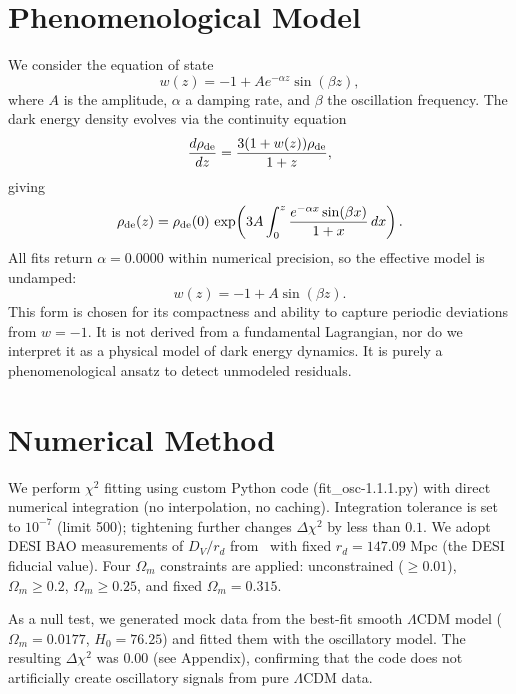 \documentclass[10pt,a4paper,twocolumn]{article}
\begin{document}
\section{Phenomenological Model}
We consider the equation of state
\[
w(z) = -1 + A e^{-\alpha z}\sin(\beta z),
\]
where $A$ is the amplitude, $\alpha$ a damping rate, and $\beta$ the oscillation frequency. The dark energy density evolves via the continuity equation
\[
\frac{d\rho_{\rm de}}{dz} = \frac{3(1+w(z))\rho_{\rm de}}{1+z},
\]
giving
\[
\rho_{\rm de}(z) = \rho_{\rm de}(0)\,\exp\!\left(3A\int_0^z \frac{e^{-\alpha x}\sin(\beta x)}{1+x}\,dx\right).
\]
All fits return $\alpha=0.0000$ within numerical precision, so the effective model is undamped:
\[
w(z) = -1 + A\sin(\beta z).
\]
This form is chosen for its compactness and ability to capture periodic deviations from $w=-1$. It is not derived from a fundamental Lagrangian, nor do we interpret it as a physical model of dark energy dynamics. It is purely a phenomenological ansatz to detect unmodeled residuals.

\section{Numerical Method}
We perform $\chi^2$ fitting using custom Python code (fit\_osc-1.1.1.py) with direct numerical integration (no interpolation, no caching). Integration tolerance is set to $10^{-7}$ (limit 500); tightening further changes $\Delta\chi^2$ by less than $0.1$. We adopt DESI BAO measurements of $D_V/r_d$ from~\cite{DESI2024} with fixed $r_d=147.09$ Mpc (the DESI fiducial value). Four $\Omega_m$ constraints are applied: unconstrained ($\ge0.01$), $\Omega_m\ge0.2$, $\Omega_m\ge0.25$, and fixed $\Omega_m=0.315$.

As a null test, we generated mock data from the best-fit smooth $\Lambda$CDM model ($\Omega_m=0.0177$, $H_0=76.25$) and fitted them with the oscillatory model. The resulting $\Delta\chi^2$ was $0.00$ (see Appendix), confirming that the code does not artificially create oscillatory signals from pure $\Lambda$CDM data.
\end{document}
